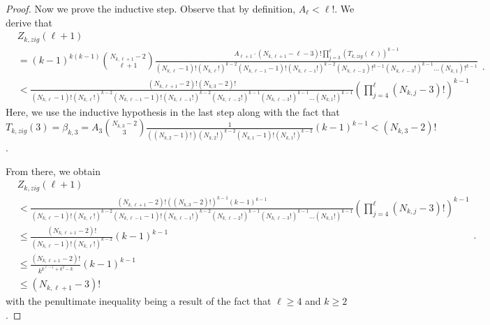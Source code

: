 \documentclass[11pt]{article}
\theoremstyle{remark}
\theoremstyle{definition}
\begin{document}
\begin{proof}
    Now we prove the inductive step. Observe that by definition, $A_{\ell} < \ell!$. We derive that 
    \begin{equation*}\begin{split}
        & Z_{k, zig}(\ell+1)   \\ & = (k-1)^{k(k-1)}\binom{N_{k, \ell+1}-2}{\ell+1} \frac{A_{\ell+1} \cdot  (N_{k, \ell+1} -\ell -3)! \prod_{j=3}^{\ell} (T_{k, zig}(\ell))^{k-1} }{(N_{k, \ell}-1)!(N_{k, \ell}!)^{k-2}(N_{k, \ell-1}-1)!(N_{k, \ell-1}!)^{k-2} (N_{k, \ell-2})!^{k-1} (N_{k, \ell-3}!)^{k-1}\dots (N_{k, 1})!^{k-1}}  \\ & < \frac{(N_{k, \ell+1}-2)! (N_{k, 3}-2)! }{(N_{k, \ell}-1)!(N_{k, \ell}!)^{k-2}(N_{k, \ell-1}-1)!(N_{k, \ell-1}!)^{k-2} (N_{k, \ell-2}!)^{k-1} (N_{k, \ell-3}!)^{k-1}\dots (N_{k, 1}!)^{k-1}} \left(\prod_{j=4}^{\ell}(N_{k, j}-3)!\right)^{k-1}\end{split}.
    \end{equation*} Here, we use the inductive hypothesis in the last step along with the fact that $T_{k, zig}(3) = \beta_{k, 3} = A_3 \binom{N_{k, 3}-2}{3}\frac{1}{((N_{k, 2}-1)!)(N_{k, 2}!)^{k-2}(N_{k, 1}-1)! (N_{k, 1}!)^{k-2}}(k-1)^{k-1} < (N_{k, 3}-2)!$. 
    
    From there, we obtain \begin{equation*}\begin{split}
        & Z_{k, zig}(\ell+1)   \\&  < \frac{(N_{k, \ell+1}-2)! ((N_{k, 3}-2)!)^{k-1} (k-1)^{k-1} }{(N_{k, \ell}-1)!(N_{k, \ell}!)^{k-2}(N_{k, \ell-1}-1)!(N_{k, \ell-1}!)^{k-2} (N_{k, \ell-2}!)^{k-1} (N_{k, \ell-3}!)^{k-1}\dots (N_{k, 1}!)^{k-1}} \left(\prod_{j=4}^{\ell} (N_{k, j}-3)!\right)^{k-1} \\ & \leq \frac{(N_{k, \ell+1}-2)!}{(N_{k, \ell}-1)!(N_{k, \ell}!)^{k-2}} (k-1)^{k-1} \\ & \leq \frac{(N_{k, \ell+1}-2)!}{k^{k^{\ell-1}+k^2-k}}(k-1)^{k-1} \\ & \leq (N_{k, \ell+1}-3)!\end{split}.
    \end{equation*} with the penultimate inequality being a result of the fact that $\ell \geq 4$ and $k\geq 2$.
\end{proof}
\end{document}
